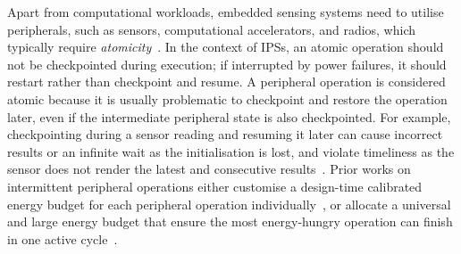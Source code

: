 




Apart from computational workloads, embedded sensing systems need to utilise peripherals, such as sensors, computational accelerators, and radios, which typically require \textit{atomicity}~\cite{berthou2020formal}.
In the context of IPSs, an atomic operation should not be checkpointed during execution; if interrupted by power failures, it should restart rather than checkpoint and resume.
A peripheral operation is considered atomic because it is usually problematic to checkpoint and restore the operation later, even if the intermediate peripheral state is also checkpointed.
For example, checkpointing during a sensor reading and resuming it later can cause incorrect results or an infinite wait as the initialisation is lost, and violate timeliness as the sensor does not render the latest and consecutive results~\cite{maeng2019supporting}. 
Prior works on intermittent peripheral operations either customise a design-time calibrated energy budget for each peripheral operation individually~\cite{gomez2016dynamic}, or allocate a universal and large energy budget that ensure the most energy-hungry operation can finish in one active cycle~\cite{maeng2019supporting}.


